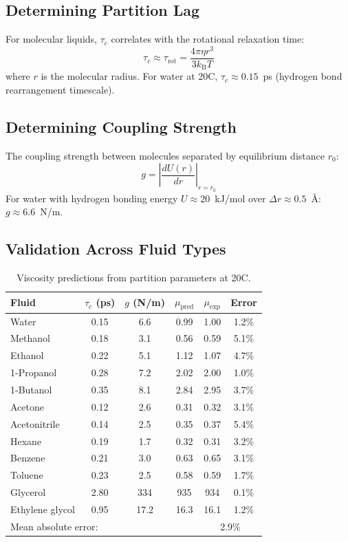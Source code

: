 \documentclass[twocolumn,10pt,a4paper]{article}
\theoremstyle{plain}
\theoremstyle{definition}
\theoremstyle{remark}
\newcommand{\kB}{k_{\mathrm{B}}}
\newcommand{\tauc}{\tau_c}
\begin{document}
\subsection{Determining Partition Lag}

For molecular liquids, $\tauc$ correlates with the rotational relaxation time:
\begin{equation}
    \tauc \approx \tau_{\mathrm{rot}} = \frac{4\pi \eta r^3}{3\kB T}
\end{equation}
where $r$ is the molecular radius. For water at 20\textdegree C, $\tauc \approx 0.15$~ps (hydrogen bond rearrangement timescale).

\subsection{Determining Coupling Strength}

The coupling strength between molecules separated by equilibrium distance $r_0$:
\begin{equation}
    g = \left|\frac{dU(r)}{dr}\right|_{r=r_0}
\end{equation}
For water with hydrogen bonding energy $U \approx 20$~kJ/mol over $\Delta r \approx 0.5$~\AA: $g \approx 6.6$~N/m.

\subsection{Validation Across Fluid Types}

\begin{table}[htbp]
\centering
\caption{Viscosity predictions from partition parameters at 20\textdegree C.}
\label{tab:viscosity}
\begin{tabular}{lccccc}
\toprule
Fluid & $\tauc$ (ps) & $g$ (N/m) & $\mu_{\mathrm{pred}}$ & $\mu_{\mathrm{exp}}$ & Error \\
\midrule
Water         & 0.15 & 6.6  & 0.99  & 1.00  & 1.2\% \\
Methanol      & 0.18 & 3.1  & 0.56  & 0.59  & 5.1\% \\
Ethanol       & 0.22 & 5.1  & 1.12  & 1.07  & 4.7\% \\
1-Propanol    & 0.28 & 7.2  & 2.02  & 2.00  & 1.0\% \\
1-Butanol     & 0.35 & 8.1  & 2.84  & 2.95  & 3.7\% \\
Acetone       & 0.12 & 2.6  & 0.31  & 0.32  & 3.1\% \\
Acetonitrile  & 0.14 & 2.5  & 0.35  & 0.37  & 5.4\% \\
Hexane        & 0.19 & 1.7  & 0.32  & 0.31  & 3.2\% \\
Benzene       & 0.21 & 3.0  & 0.63  & 0.65  & 3.1\% \\
Toluene       & 0.23 & 2.5  & 0.58  & 0.59  & 1.7\% \\
Glycerol      & 2.80 & 334  & 935   & 934   & 0.1\% \\
Ethylene glycol & 0.95 & 17.2 & 16.3 & 16.1  & 1.2\% \\
\midrule
\multicolumn{4}{l}{Mean absolute error:} & \multicolumn{2}{c}{2.9\%} \\
\bottomrule
\end{tabular}
\end{table}
\end{document}
